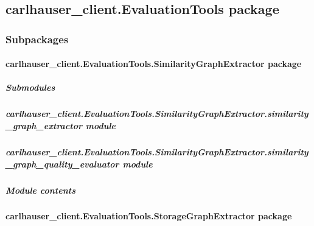 \documentclass[letterpaper,10pt,english]{sphinxmanual}
\begin{document}
\subsection{carlhauser\_client.EvaluationTools package}
\label{\detokenize{carlhauser_client.EvaluationTools:carlhauser-client-evaluationtools-package}}\label{\detokenize{carlhauser_client.EvaluationTools::doc}}

\subsubsection{Subpackages}
\label{\detokenize{carlhauser_client.EvaluationTools:subpackages}}

\paragraph{carlhauser\_client.EvaluationTools.SimilarityGraphExtractor package}
\label{\detokenize{carlhauser_client.EvaluationTools.SimilarityGraphExtractor:carlhauser-client-evaluationtools-similaritygraphextractor-package}}\label{\detokenize{carlhauser_client.EvaluationTools.SimilarityGraphExtractor::doc}}

\subparagraph{Submodules}
\label{\detokenize{carlhauser_client.EvaluationTools.SimilarityGraphExtractor:submodules}}

\subparagraph{carlhauser\_client.EvaluationTools.SimilarityGraphExtractor.similarity\_graph\_extractor module}
\label{\detokenize{carlhauser_client.EvaluationTools.SimilarityGraphExtractor:carlhauser-client-evaluationtools-similaritygraphextractor-similarity-graph-extractor-module}}

\subparagraph{carlhauser\_client.EvaluationTools.SimilarityGraphExtractor.similarity\_graph\_quality\_evaluator module}
\label{\detokenize{carlhauser_client.EvaluationTools.SimilarityGraphExtractor:carlhauser-client-evaluationtools-similaritygraphextractor-similarity-graph-quality-evaluator-module}}

\subparagraph{Module contents}
\label{\detokenize{carlhauser_client.EvaluationTools.SimilarityGraphExtractor:module-carlhauser_client.EvaluationTools.SimilarityGraphExtractor}}\label{\detokenize{carlhauser_client.EvaluationTools.SimilarityGraphExtractor:module-contents}}

\paragraph{carlhauser\_client.EvaluationTools.StorageGraphExtractor package}
\label{\detokenize{carlhauser_client.EvaluationTools.StorageGraphExtractor:carlhauser-client-evaluationtools-storagegraphextractor-package}}\label{\detokenize{carlhauser_client.EvaluationTools.StorageGraphExtractor::doc}}
\end{document}
